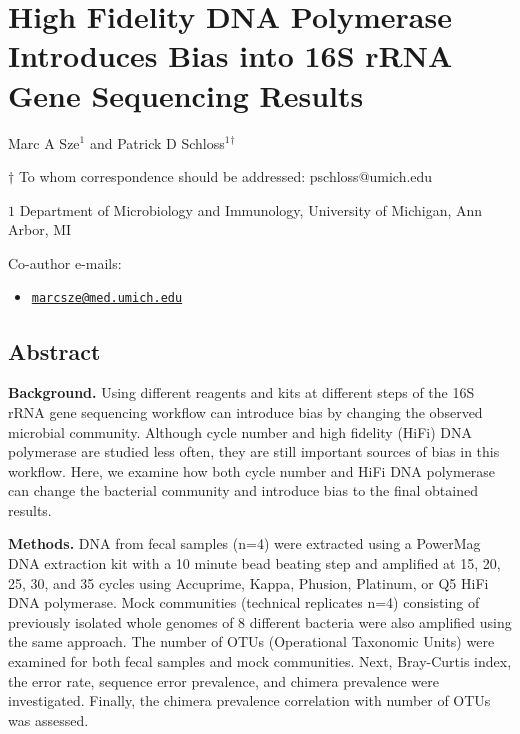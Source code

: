 \documentclass[12pt,]{article}
\title{}
\author{}
\date{}
\providecommand{\tightlist}{%
  \setlength{\itemsep}{0pt}\setlength{\parskip}{0pt}}
\begin{document}
\section{High Fidelity DNA Polymerase Introduces Bias into 16S rRNA Gene
Sequencing
Results}\label{high-fidelity-dna-polymerase-introduces-bias-into-16s-rrna-gene-sequencing-results}

\begin{center}
\vspace{25mm}

Marc A Sze${^1}$ and Patrick D Schloss${^1}$${^\dagger}$

\vspace{20mm}

$\dagger$ To whom correspondence should be addressed: pschloss@umich.edu

$1$ Department of Microbiology and Immunology, University of Michigan, Ann Arbor, MI




\end{center}

Co-author e-mails:

\begin{itemize}
\tightlist
\item
  \href{mailto:marcsze@med.umich.edu}{\nolinkurl{marcsze@med.umich.edu}}
\end{itemize}

\newpage

\linenumbers

\subsection{Abstract}\label{abstract}

\textbf{Background.} Using different reagents and kits at different
steps of the 16S rRNA gene sequencing workflow can introduce bias by
changing the observed microbial community. Although cycle number and
high fidelity (HiFi) DNA polymerase are studied less often, they are
still important sources of bias in this workflow. Here, we examine how
both cycle number and HiFi DNA polymerase can change the bacterial
community and introduce bias to the final obtained results.

\textbf{Methods.} DNA from fecal samples (n=4) were extracted using a
PowerMag DNA extraction kit with a 10 minute bead beating step and
amplified at 15, 20, 25, 30, and 35 cycles using Accuprime, Kappa,
Phusion, Platinum, or Q5 HiFi DNA polymerase. Mock communities
(technical replicates n=4) consisting of previously isolated whole
genomes of 8 different bacteria were also amplified using the same
approach. The number of OTUs (Operational Taxonomic Units) were examined
for both fecal samples and mock communities. Next, Bray-Curtis index,
the error rate, sequence error prevalence, and chimera prevalence were
investigated. Finally, the chimera prevalence correlation with number of
OTUs was assessed.
\end{document}
